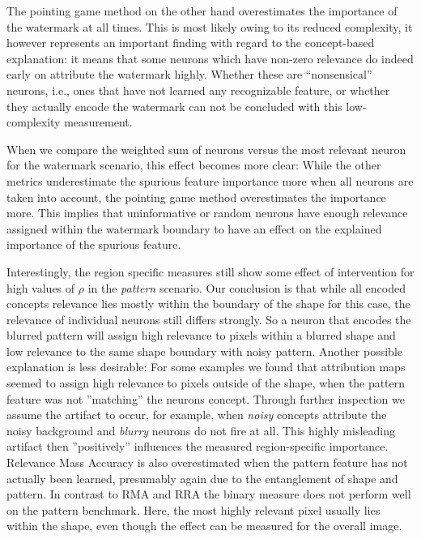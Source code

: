 The pointing game method on the other hand overestimates the importance of the watermark at all times. This is most likely owing to its reduced complexity, it however represents an important finding with regard to the concept-based explanation: it means that some neurons which have non-zero relevance do indeed early on attribute the watermark highly. Whether these are ``nonsensical'' neurons, i.e., ones that have not learned any recognizable feature, or whether they actually encode the watermark can not be concluded with this low-complexity measurement. 

When we compare the weighted sum of neurons versus the most relevant neuron for the watermark scenario, this effect becomes more clear: While the other metrics underestimate the spurious feature importance more when all neurons are taken into account, the pointing game method overestimates the importance more. 
This implies that uninformative or random neurons have enough relevance assigned within the watermark boundary to have an effect on the explained importance of the spurious feature. 

Interestingly, the region specific measures still show some effect of intervention for high values of $\rho$ in the \textit{pattern} scenario. 
Our conclusion is that while all encoded concepts relevance lies mostly within the boundary of the shape for this case, the relevance of individual neurons still differs strongly. So a neuron that encodes the blurred pattern will assign high relevance to pixels within a blurred shape and low relevance to the same shape boundary with noisy pattern. 
Another possible explanation is less desirable: For some examples we found that attribution maps seemed to assign high relevance to pixels outside of the shape, when the pattern feature was not ''matching'' the neurons concept. Through further inspection we assume the artifact to occur, for example, when \textit{noisy} concepts attribute the noisy background and \textit{blurry} neurons do not fire at all. This highly misleading artifact then ''positively'' influences the measured region-specific importance. Relevance Mass Accuracy is also overestimated when the pattern feature has not actually been learned, presumably again due to the entanglement of shape and pattern.
In contrast to RMA and RRA the binary measure does not perform well on the pattern benchmark. Here, the most highly relevant pixel usually lies within the shape, even though the effect can be measured for the overall image. 

